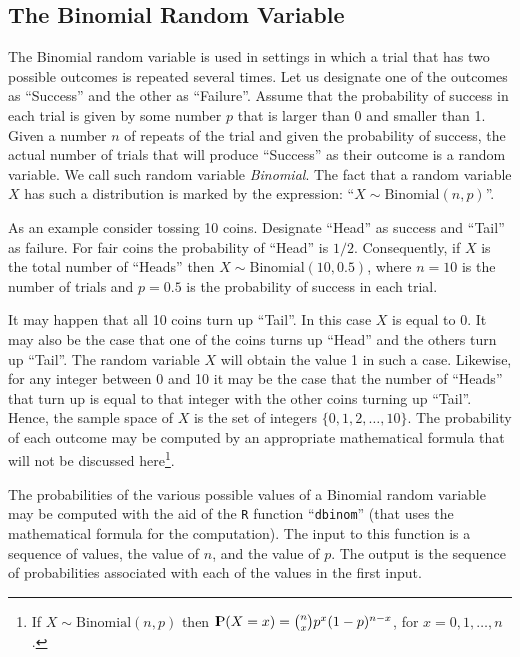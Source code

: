 \documentclass[]{krantz}
\newcommand{\Prob}{{\rm I\kern-.3em P}}
\theoremstyle{definition}
\theoremstyle{definition}
\theoremstyle{definition}
\theoremstyle{remark}
\begin{document}
\subsection{The Binomial Random
Variable}\label{the-binomial-random-variable}

The Binomial random variable is used in settings in which a trial that
has two possible outcomes is repeated several times. Let us designate
one of the outcomes as ``Success'' and the other as ``Failure''. Assume
that the probability of success in each trial is given by some number
\(p\) that is larger than 0 and smaller than 1. Given a number \(n\) of
repeats of the trial and given the probability of success, the actual
number of trials that will produce ``Success'' as their outcome is a
random variable. We call such random variable \emph{Binomial}. The fact
that a random variable \(X\) has such a distribution is marked by the
expression: ``\(X \sim \mathrm{Binomial}(n,p)\)''.

As an example consider tossing 10 coins. Designate ``Head'' as success
and ``Tail'' as failure. For fair coins the probability of ``Head'' is
\(1/2\). Consequently, if \(X\) is the total number of ``Heads'' then
\(X \sim \mathrm{Binomial}(10,0.5)\), where \(n=10\) is the number of
trials and \(p=0.5\) is the probability of success in each trial.

It may happen that all 10 coins turn up ``Tail''. In this case \(X\) is
equal to 0. It may also be the case that one of the coins turns up
``Head'' and the others turn up ``Tail''. The random variable \(X\) will
obtain the value 1 in such a case. Likewise, for any integer between 0
and 10 it may be the case that the number of ``Heads'' that turn up is
equal to that integer with the other coins turning up ``Tail''. Hence,
the sample space of \(X\) is the set of integers
\(\{0, 1, 2, \ldots, 10\}\). The probability of each outcome may be
computed by an appropriate mathematical formula that will not be
discussed here\footnote{If \(X\sim \mathrm{Binomial}(n,p)\) then
  \(\Prob(X = x) = {n \choose x} p^x (1-p)^{n-x}\), for
  \(x = 0, 1, \ldots, n\).}.

The probabilities of the various possible values of a Binomial random
variable may be computed with the aid of the \texttt{R} function
``\texttt{dbinom}'' (that uses the mathematical formula for the
computation). The input to this function is a sequence of values, the
value of \(n\), and the value of \(p\). The output is the sequence of
probabilities associated with each of the values in the first input.
\end{document}
